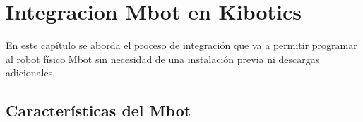 \documentclass{report}
\begin{document}

\chapter{Integracion Mbot en Kibotics}
En este capítulo se aborda el proceso de integración que va a permitir programar al robot físico Mbot sin necesidad de una instalación previa ni descargas adicionales.

\section{Características del Mbot}
\end{document}
